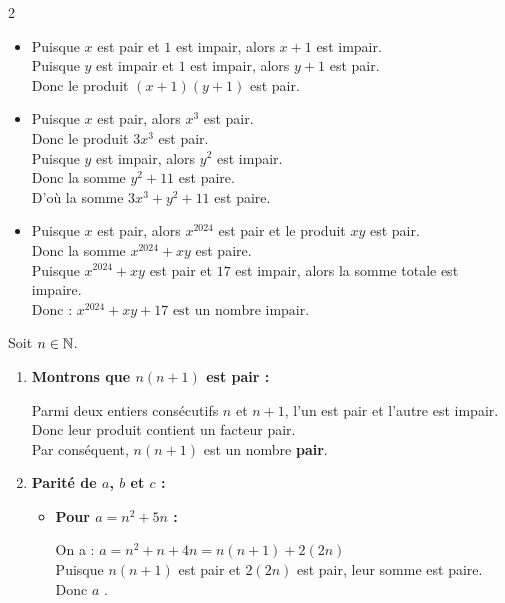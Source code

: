 \documentclass[10pt, a4paper]{article}
\begin{document}
\begin{multicols*}{2}
\begin{Solution}[APPLICATION][2]
\begin{itemize}[leftmargin=*,itemsep=0.5pt]
    \item Puisque $x$ est pair et $1$ est impair, alors $x + 1$ est impair. \\
    Puisque $y$ est impair et $1$ est impair, alors $y + 1$ est pair. \\
    Donc le produit $(x + 1)(y + 1)$ est pair.

    \item Puisque $x$ est pair, alors $x^3$ est pair. \\
    Donc le produit $3x^3$ est pair. \\
    Puisque $y$ est impair, alors $y^2$ est impair. \\
    Donc la somme $y^2 + 11$ est paire. \\
    D'où la somme $3x^3 + y^2 + 11$ est paire.

    \item Puisque $x$ est pair, alors $x^{2024}$ est pair et le produit $xy$ est pair. \\
    Donc la somme $x^{2024} + xy$ est paire. \\
    Puisque $x^{2024} + xy$ est pair et $17$ est impair, alors la somme totale est impaire. \\
    Donc : \quad $x^{2024} + xy + 17 \text{ est un nombre impair.}$
\end{itemize}
\end{Solution}

\begin{Solution}[APPLICATION][3]
Soit $n \in \mathbb{N}$.
\begin{enumerate}[leftmargin=*,itemsep=0.5pt]
    \item \textbf{Montrons que $n(n+1)$ est pair :}

    Parmi deux entiers consécutifs $n$ et $n+1$, l'un est pair et l'autre est impair. \\
    Donc leur produit contient un facteur pair. \\
    Par conséquent, $n(n+1)$ est un nombre \textbf{pair}.

    \item \textbf{Parité de $a$, $b$ et $c$ :}
    \begin{itemize}[leftmargin=*,itemsep=0.5pt]
        \item \textbf{Pour $a = n^2 + 5n$ :}

        On a : $a = n^2 + n + 4n = n(n+1) + 2(2n)$ \\
        Puisque $n(n+1)$ est pair et $2(2n)$ est pair, leur somme est paire. \\
        Donc $a$ .


\end{itemize}
\end{enumerate}
\end{Solution}
\end{multicols*}
\end{document}
